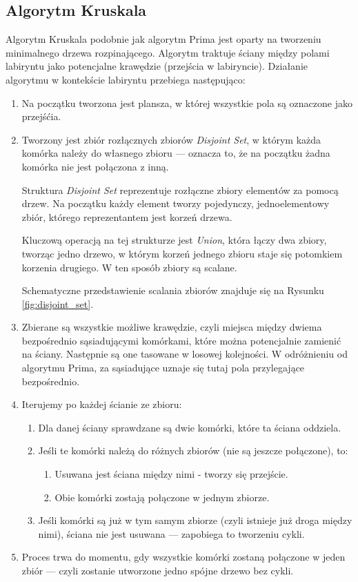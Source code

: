 \subsection{Algorytm Kruskala}

Algorytm Kruskala podobnie jak algorytm Prima jest oparty na tworzeniu minimalnego drzewa rozpinającego. Algorytm traktuje ściany między polami labiryntu jako potencjalne krawędzie (przejścia w labiryncie). Działanie algorytmu w kontekście labiryntu przebiega następująco:

\begin{enumerate}
    \item Na początku tworzona jest plansza, w której wszystkie pola są oznaczone jako przejśćia.

    \item Tworzony jest zbiór rozłącznych zbiorów \textit{Disjoint Set}, w którym każda komórka należy do własnego zbioru — oznacza to, że na początku żadna komórka nie jest połączona z inną.

    Struktura \textit{Disjoint Set} reprezentuje rozłączne zbiory elementów za pomocą drzew. Na początku każdy element tworzy pojedynczy, jednoelementowy zbiór, którego reprezentantem jest korzeń drzewa.

    Kluczową operacją na tej strukturze jest \textit{Union}, która łączy dwa zbiory, tworząc jedno drzewo, w którym korzeń jednego zbioru staje się potomkiem korzenia drugiego. W ten sposób zbiory są scalane.

    Schematyczne przedstawienie scalania zbiorów znajduje się na Rysunku \ref{fig:disjoint_set}.

    

    \item Zbierane są wszystkie możliwe krawędzie, czyli miejsca między dwiema bezpośrednio sąsiadującymi komórkami, które można potencjalnie zamienić na ściany. Następnie są one tasowane w losowej kolejności. W odróżnieniu od algorytmu Prima, za sąsiadujące uznaje się tutaj pola przylegające bezpośrednio.

    \item Iterujemy po każdej ścianie ze zbioru:
    \begin{enumerate}
        \item Dla danej ściany sprawdzane są dwie komórki, które ta ściana oddziela.
        \item Jeśli te komórki należą do różnych zbiorów (nie są jeszcze połączone), to:
        \begin{enumerate}
            \item Usuwana jest ściana między nimi - tworzy się przejście.
            \item Obie komórki zostają połączone w jednym zbiorze.
        \end{enumerate}
        \item Jeśli komórki są już w tym samym zbiorze (czyli istnieje już droga między nimi), ściana nie jest usuwana — zapobiega to tworzeniu cykli.
    \end{enumerate}

    \item Proces trwa do momentu, gdy wszystkie komórki zostaną połączone w jeden zbiór — czyli zostanie utworzone jedno spójne drzewo bez cykli.
\end{enumerate}